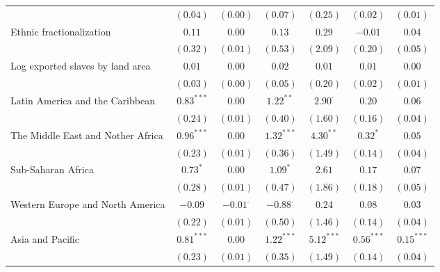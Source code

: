 \begin{sidewaystable}
\begin{center}
{\begin{tabular}{l c c c c c c}
                                  & $(0.04)$     & $(0.00)$        & $(0.07)$        & $(0.25)$       & $(0.02)$     & $(0.01)$       \\
Ethnic fractionalization          & $0.11$       & $0.00$          & $0.13$          & $0.29$         & $-0.01$      & $0.04$         \\
                                  & $(0.32)$     & $(0.01)$        & $(0.53)$        & $(2.09)$       & $(0.20)$     & $(0.05)$       \\
Log exported slaves by land area  & $0.01$       & $0.00$          & $0.02$          & $0.01$         & $0.01$       & $0.00$         \\
                                  & $(0.03)$     & $(0.00)$        & $(0.05)$        & $(0.20)$       & $(0.02)$     & $(0.01)$       \\
Latin America and the Caribbean   & $0.83^{***}$ & $0.00$          & $1.22^{**}$     & $2.90^{\cdot}$ & $0.20$       & $0.06$         \\
                                  & $(0.24)$     & $(0.01)$        & $(0.40)$        & $(1.60)$       & $(0.16)$     & $(0.04)$       \\
The Middle East and Nother Africa & $0.96^{***}$ & $0.00$          & $1.32^{***}$    & $4.30^{**}$    & $0.32^{*}$   & $0.05$         \\
                                  & $(0.23)$     & $(0.01)$        & $(0.36)$        & $(1.49)$       & $(0.14)$     & $(0.04)$       \\
Sub-Saharan Africa                & $0.73^{*}$   & $0.00$          & $1.09^{*}$      & $2.61$         & $0.17$       & $0.07$         \\
                                  & $(0.28)$     & $(0.01)$        & $(0.47)$        & $(1.86)$       & $(0.18)$     & $(0.05)$       \\
Western Europe and North America  & $-0.09$      & $-0.01^{\cdot}$ & $-0.88^{\cdot}$ & $0.24$         & $0.08$       & $0.03$         \\
                                  & $(0.22)$     & $(0.01)$        & $(0.50)$        & $(1.46)$       & $(0.14)$     & $(0.04)$       \\
Asia and Pacific                  & $0.81^{***}$ & $0.00$          & $1.22^{***}$    & $5.12^{***}$   & $0.56^{***}$ & $0.15^{***}$   \\
                                  & $(0.23)$     & $(0.01)$        & $(0.35)$        & $(1.49)$       & $(0.14)$     & $(0.04)$       \\

\end{tabular}}
\end{center}
\end{sidewaystable}
